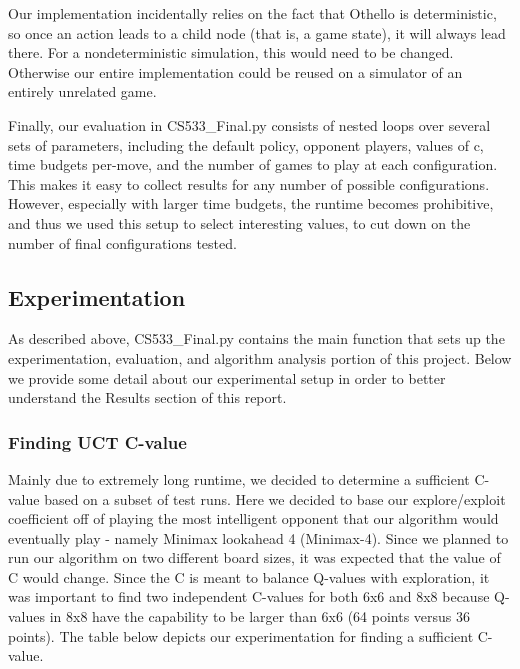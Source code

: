 \documentclass[12pt,letterpaper]{article}
\begin{document}
Our implementation incidentally relies on the fact that Othello is deterministic, so once an action leads to a child node (that is, a game state), it will always lead there. For a nondeterministic simulation, this would need to be changed. Otherwise our entire implementation could be reused on a simulator of an entirely unrelated game.

Finally, our evaluation in CS533\_Final.py consists of nested loops over several sets of parameters, including the default policy, opponent players, values of c, time budgets per-move, and the number of games to play at each configuration. This makes it easy to collect results for any number of possible configurations. However, especially with larger time budgets, the runtime becomes prohibitive, and thus we used this setup to select interesting values, to cut down on the number of final configurations tested.

\subsection{Experimentation}
As described above, CS533\_Final.py contains the main function that sets up the experimentation, evaluation, and algorithm analysis portion of this project. Below we provide some detail about our experimental setup in order to better understand the Results section of this report.

\subsubsection{Finding UCT C-value} 
Mainly due to extremely long runtime, we decided to determine a sufficient C-value based on a subset of test runs. Here we decided to base our explore/exploit coefficient off of playing the most intelligent opponent that our algorithm would eventually play - namely Minimax lookahead 4 (Minimax-4). Since we planned to run our algorithm on two different board sizes, it was expected that the value of C would change. Since the C is meant to balance Q-values with exploration, it was important to find two independent C-values for both 6x6 and 8x8 because Q-values in 8x8 have the capability to be larger than 6x6 (64 points versus 36 points).  The table below depicts our experimentation for finding a sufficient C-value.
\end{document}
